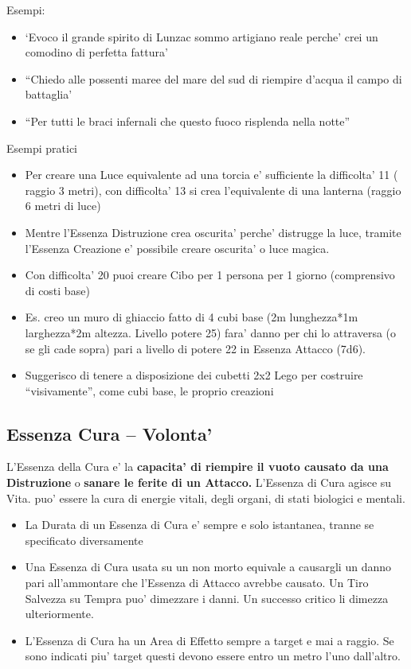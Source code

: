 \documentclass[a4paper,11pt,twoside,openany]{dndbook}
\begin{document}
\bigskip

Esempi:
\begin{itemize}
\item `Evoco il grande spirito di Lunzac sommo artigiano reale perche' crei un comodino di perfetta fattura' 
\item ``Chiedo alle possenti maree del mare del sud di riempire d'acqua il campo di battaglia' 
\item ``Per tutti le braci infernali che questo fuoco risplenda nella notte'' 
\end{itemize}

\bigskip

Esempi pratici
\begin{itemize}
\item Per creare una Luce equivalente ad una torcia e' sufficiente la difficolta' 11 ( raggio 3 metri), con difficolta' 13 si crea l'equivalente di una lanterna (raggio 6 metri di luce) 
\item Mentre l'Essenza Distruzione crea oscurita' perche' distrugge la luce, tramite l'Essenza Creazione e' possibile creare oscurita' o luce magica. 
\item Con difficolta' 20 puoi creare Cibo per 1 persona per 1 giorno (comprensivo di costi base) 
\item Es. creo un muro di ghiaccio fatto di 4 cubi base (2m lunghezza{*}1m larghezza{*}2m altezza. Livello potere 25) fara' danno per chi lo attraversa (o se gli cade sopra) pari a livello di potere 22 in Essenza Attacco (7d6). 
\item Suggerisco di tenere a disposizione dei cubetti 2x2 Lego per costruire ``visivamente'', come cubi base, le proprio creazioni 
\end{itemize}

\pagebreak

\subsection{Essenza Cura -- Volonta'}

\label{essenza-cura---volonta}

L'Essenza della Cura e' la \textbf{capacita' di riempire il vuoto causato da una Distruzione} o \textbf{sanare le ferite di un Attacco.} L'Essenza di Cura agisce su Vita. puo' essere la cura di energie vitali, degli organi, di stati biologici e mentali.


\begin{itemize}
\item 
La Durata di un Essenza di Cura e' sempre e solo istantanea, tranne se specificato diversamente 
\item 
Una Essenza di Cura usata su un non morto equivale a causargli un danno pari all'ammontare che l'Essenza di Attacco avrebbe causato. Un Tiro Salvezza su Tempra puo' dimezzare i danni. Un successo critico li dimezza ulteriormente. 
\item 
L'Essenza di Cura ha un Area di Effetto sempre a target e mai a raggio. Se sono indicati piu' target questi devono essere entro un metro l'uno dall'altro. 
\end{itemize}
\end{document}
